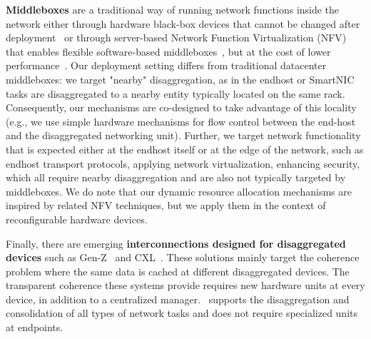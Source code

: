 \textbf{Middleboxes} are a traditional way of running network functions inside the network either through hardware black-box devices that cannot be changed after deployment~\cite{aplomb-sigcomm20,comb-nsdi12,walfish-osdi04} or through server-based Network Function Virtualization (NFV) that enables flexible software-based middleboxes~\cite{clickos-nsdi14,e2-sosp15,metron-nsdi18,NFP-sigcomm17,parabox-sosr17}, but at the cost of lower performance~\cite{netbricks,netvm-nsdi14}.  Our deployment setting differs from traditional datacenter middleboxes: we target "nearby" disaggregation, as in the endhost or SmartNIC tasks are disaggregated to a nearby entity typically located on the same rack. Consequently, our mechanisms are co-designed to take advantage of this locality (e.g., we use simple hardware mechanisms for flow control between the end-host and the disaggregated networking unit). Further, we target network functionality that is expected either at the endhost itself or at the edge of the network, such as endhost transport protocols, applying network virtualization, enhancing security, which all require nearby disaggregation and are also not typically targeted by middleboxes. We do note that our dynamic resource allocation mechanisms are inspired by related NFV techniques, but we apply them in the context of reconfigurable hardware devices.

Finally, there are emerging \textbf{interconnections designed for disaggregated devices} such as Gen-Z~\cite{GenZ} and CXL~\cite{CXL}.
These solutions mainly target the coherence problem where the same data is cached at different disaggregated devices.
The transparent coherence these systems provide requires new hardware units at every device, in addition to a centralized manager.
\snic\ supports the disaggregation and consolidation of all types of network tasks and does not require specialized units at endpoints.
